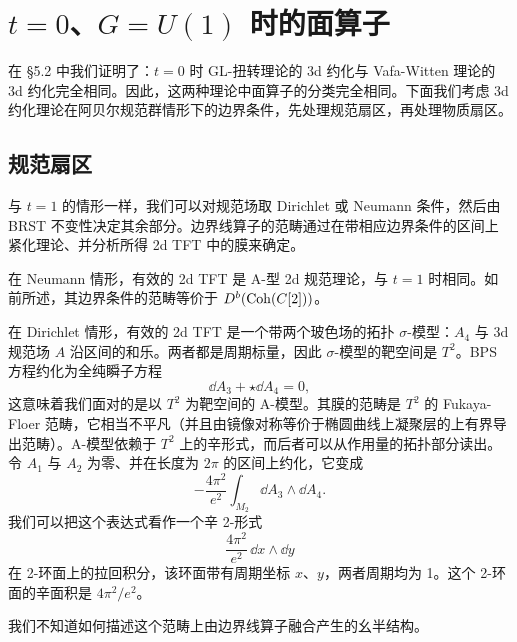\section{\texorpdfstring{$t=0$、$G=U(1)$}{t=0、G=U(1)} 时的面算子}

在 §5.2 中我们证明了：$t=0$ 时 GL-扭转理论的 3d 约化与 Vafa-Witten 理论的 3d 约化完全相同。因此，这两种理论中面算子的分类完全相同。下面我们考虑 3d 约化理论在阿贝尔规范群情形下的边界条件，先处理规范扇区，再处理物质扇区。


\subsection{规范扇区}

与 $t=1$ 的情形一样，我们可以对规范场取 Dirichlet 或 Neumann 条件，然后由 BRST 不变性决定其余部分。边界线算子的范畴通过在带相应边界条件的区间上紧化理论、并分析所得 2d TFT 中的膜来确定。

在 Neumann 情形，有效的 2d TFT 是 A-型 2d 规范理论，与 $t=1$ 时相同。如前所述，其边界条件的范畴等价于 $D^b(\mathrm{Coh}(C[2]))$。

在 Dirichlet 情形，有效的 2d TFT 是一个带两个玻色场的拓扑 $\sigma$-模型：$A_4$ 与 3d 规范场 $A$ 沿区间的和乐。两者都是周期标量，因此 $\sigma$-模型的靶空间是 $T^2$。BPS 方程约化为全纯瞬子方程
\[
  \dd A_3+\star\dd A_4=0,
\]
这意味着我们面对的是以 $T^2$ 为靶空间的 A-模型。其膜的范畴是 $T^2$ 的 Fukaya-Floer 范畴，它相当不平凡（并且由镜像对称等价于椭圆曲线上凝聚层的上有界导出范畴）。A-模型依赖于 $T^2$ 上的辛形式，而后者可以从作用量的拓扑部分读出。令 $A_1$ 与 $A_2$ 为零、并在长度为 $2\pi$ 的区间上约化，它变成
\[
  -\frac{4\pi^2}{e^2}\int_{M_2}\dd A_3\wedge\dd A_4 .
\]
我们可以把这个表达式看作一个辛 2-形式
\[
  \frac{4\pi^2}{e^2}\,\dd x\wedge\dd y
\]
在 2-环面上的拉回积分，该环面带有周期坐标 $x$、$y$，两者周期均为 1。这个 2-环面的辛面积是 $4\pi^2/e^2$。

我们不知道如何描述这个范畴上由边界线算子融合产生的幺半结构。


